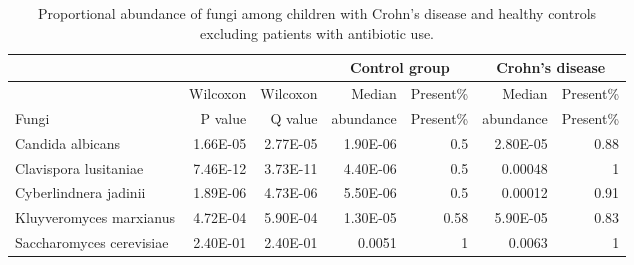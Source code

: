 \newpage
{\footnotesize
	\renewcommand{\arraystretch}{0.7} \setlength{\tabcolsep}{3pt}
	\begin{longtable}{ | l | r | r | r | r | r | r  | }
		\caption[Proportional abundance of fungi among children with Crohn's disease and healthy controls excluding patients with antibiotic use]{Proportional abundance of fungi among children with Crohn's disease and healthy controls excluding patients with antibiotic use.} 
		\label{TS11} \\
		
		\hline
		\multicolumn{3}{|c|}{} & \multicolumn{2}{c}{Control group}
		& \multicolumn{2}{|c|}{Crohn's disease}\\
		\hline 
		 & Wilcoxon & Wilcoxon & Median  & Present\% & Median  & Present\% \\ 
		Fungi &  P value & Q value &  abundance & Present\% &  abundance & Present\% \\ 
		\hline 
		\endfirsthead
		
		
		\endfoot
		
		\hline 
		\endlastfoot
		
		
		
		Candida albicans  &  1.66E-05  &  2.77E-05  &  1.90E-06  &  0.5  &  2.80E-05  &  0.88 \\ 
		Clavispora lusitaniae  &  7.46E-12  &  3.73E-11  &  4.40E-06  &  0.5  &  0.00048  &  1 \\ 
		Cyberlindnera jadinii  &  1.89E-06  &  4.73E-06  &  5.50E-06  &  0.5  &  0.00012  &  0.91 \\ 
		Kluyveromyces marxianus  &  4.72E-04  &  5.90E-04  &  1.30E-05  &  0.58  &  5.90E-05  &  0.83 \\ 
		Saccharomyces cerevisiae  &  2.40E-01  &  2.40E-01  &  0.0051  &  1  &  0.0063  &  1
		
	\end{longtable}
}






